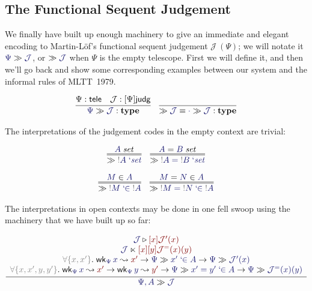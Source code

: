 \documentclass[acmtoplas]{acmtrans2m}
\def\InputModeColorName{MidnightBlue}
\def\OutputModeColorName{Maroon}
\newcommand\InputMode[1]{{\color{\InputModeColorName}{#1}}}
\newcommand\OutputMode[1]{{\color{\OutputModeColorName}{#1}}}
\newcommand\type{\mathbf{type}}
\newcommand\sorttele{\mathsf{tele}}
\newcommand\sortj{\mathsf{judg}}
\newcommand\sortoj[1]{[#1]\sortj}
\newcommand\nobind[1]{{\color{Gray}!}#1}
\newcommand\isset[1]{\InputMode{#1}\;\mathit{set}}
\newcommand\eqset[2]{\InputMode{#1}=\InputMode{#2}\;\mathit{set}}
\newcommand\mem[2]{\InputMode{#1}\in\InputMode{#2}}
\newcommand\eqmem[3]{\InputMode{#1}=\InputMode{#2}\in\InputMode{#3}}
\newcommand\lfpi[2]{{\color{Gray}\forall\{#1\}}.\;#2}
\newcommand\weaken[3]{\mathsf{wk}_{\InputMode{#1}}\,\InputMode{#2}\leadsto\OutputMode{#3}}
\newcommand\qisset[1]{#1\;`\mathit{set}}
\newcommand\qeqset[2]{#1=#2\;`\mathit{set}}
\newcommand\qmem[2]{#1\;`\!\!\in#2}
\newcommand\qeqmem[3]{#1=#2\;`\!\!\in#3}
\newcommand\sploot[2]{\InputMode{#1}\triangleright\OutputMode{#2}}
\newcommand\refract[2]{\InputMode{#1}\ltimes\OutputMode{#2}}
\newcommand\sequent[2]{\InputMode{#1}\gg\InputMode{#2}}
\newcommand\nece[1]{\gg\InputMode{#1}}
\begin{document}
\subsection{The Functional Sequent Judgement}

We finally have built up enough machinery to give an immediate and elegant
encoding to Martin-L\"of's functional sequent judgement $\mathcal{J}\ (\Psi)$;
we will notate it $\sequent{\Psi}{\mathcal{J}}$, or $\nece{\mathcal{J}}$ when
$\Psi$ is the empty telescope. First we will define it, and then we'll go back
and show some corresponding examples between our system and the informal rules
of MLTT~1979.

\begin{gather*}
  \infer{
    \sequent{\Psi}{\mathcal{J}}:\type
  }{
    \Psi:\sorttele &
    \mathcal{J}:\sortoj\Psi
  }
  \quad
  \infer{
    \nece{\mathcal{J}} \equiv \sequent{\cdot}{\mathcal{J}} : \type
  }{
  }
\end{gather*}

The interpretations of the judgement codes in the empty context are trivial:

\begin{gather*}
  \infer={
    \nece{\qisset{\nobind{A}}}
  }{
    \isset{A}
  }
  \quad
  \infer={
    \nece{\qeqset{\nobind{A}}{\nobind{B}}}
  }{
    \eqset{A}{B}
  }\\[6pt]
  \infer={
    \nece{\qmem{\nobind{M}}{\nobind{A}}}
  }{
    \mem{M}{A}
  }
  \quad
  \infer={
    \nece{\qeqmem{\nobind{M}}{\nobind{N}}{\nobind{A}}}
  }{
    \eqmem{M}{N}{A}
  }
\end{gather*}

The interpretations in open contexts may be done in one fell swoop using the
machinery that we have built up so far:

\begin{gather*}
  \infer{
    \sequent{\Psi,A}{\mathcal{J}}
  }{
    \begin{array}{c}
      \sploot{\mathcal{J}}{[x]\mathcal{J}'(x)}\\
      \refract{\mathcal{J}}{[x][y]\mathcal{J}^=(x)(y)}\\
      \lfpi{x,x'}{
        \weaken{\Psi}{x}{x'}
        \to\sequent{\Psi}{\qmem{x'}{A}}
        \to\sequent{\Psi}{\mathcal{J}'(x)}
      }\\
      \lfpi{x,x',y,y'}{
        \weaken{\Psi}{x}{x'}
        \to\weaken{\Psi}{y}{y'}
        \to\sequent{\Psi}{\qeqmem{x'}{y'}{A}}
        \to\sequent{\Psi}{\mathcal{J}^=(x)(y)}
      }\\
    \end{array}
  }
\end{gather*}


\nocite{*}

\end{document}

